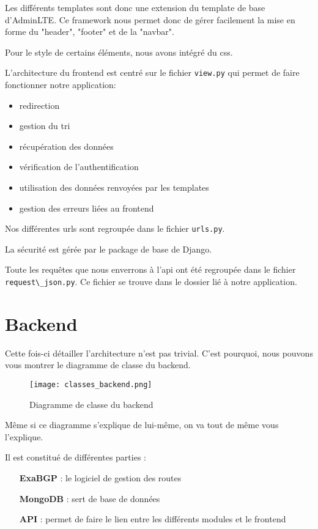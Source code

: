 Les différents templates sont donc une extension du template de base d'AdminLTE. Ce framework nous permet donc de gérer facilement la mise en forme du "header", "footer" et de la "navbar".

Pour le style de certains éléments, nous avons intégré du css.

L'architecture du frontend est centré sur le fichier \verb+view.py+ qui permet de faire fonctionner notre application:
\begin{itemize}
    \item redirection
    \item gestion du tri
    \item récupération des données
    \item vérification de l'authentification
    \item utilisation des données renvoyées par les templates
    \item gestion des erreurs liées au frontend \newline
\end{itemize}

Nos différentes urls sont regroupée dans le fichier \verb+urls.py+.

La sécurité est gérée par le package de base de Django.

Toute les requêtes que nous enverrons à l'api ont été regroupée dans le fichier \verb+request\_json.py+. Ce fichier se trouve dans le dossier lié à notre application.

\section{Backend}

Cette fois-ci détailler l'architecture n'est pas trivial. C'est pourquoi, nous pouvons vous montrer le diagramme de classe du backend.

\begin{figure}[H]
    \texttt{[image: classes\_backend.png]}
    \caption{Diagramme de classe du backend}
    \label{fig:class_backend}
\end{figure}

Même si ce diagramme s'explique de lui-même, on va tout de même vous l'explique.

Il est constitué de différentes parties :
\begin{itemize}
    \item [\textbf{ExaBGP}] : le logiciel de gestion des routes
    \item [\textbf{MongoDB}] : sert de base de données
     \item [\textbf{API}] : permet de faire le lien entre les différents modules et le frontend
\end{itemize}

